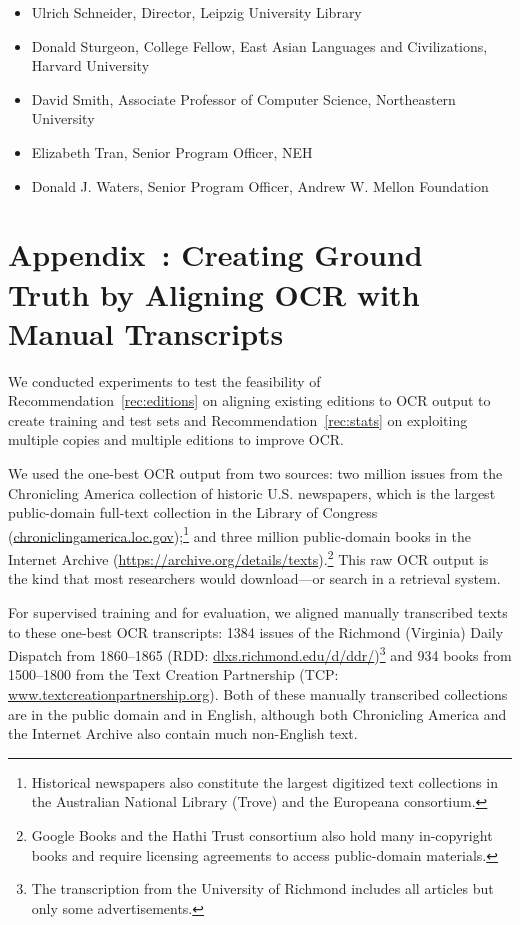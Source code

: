 \documentclass[twoside,11pt]{report}
\newcounter{appcounter}
\renewcommand{\theappcounter}{\Alph{appcounter}}
\renewcommand{\appendix}[2]{\refstepcounter{appcounter}%
  \label{app:#1}%
  \section{Appendix~\theappcounter: #2}%
  \label{sec:app-#1}}
\begin{document}
\begin{itemize}
\item Ulrich Schneider, Director, Leipzig University Library

\item Donald Sturgeon, College Fellow, East Asian Languages and Civilizations, Harvard University

\item David Smith, Associate Professor of Computer Science, Northeastern University

\item Elizabeth Tran, Senior Program Officer, NEH

\item Donald J. Waters, Senior Program Officer, Andrew W. Mellon Foundation

\end{itemize}

\appendix{eval}{Creating Ground Truth by Aligning OCR with Manual Transcripts}

We conducted experiments to test the feasibility of Recommendation~\ref{rec:editions} on aligning existing editions to OCR output to create training and test sets and Recommendation~\ref{rec:stats} on exploiting multiple copies and multiple editions to improve OCR.

We used the one-best OCR output from two sources: two million issues from the Chronicling America collection of historic U.S. newspapers, which is the largest public-domain full-text collection in the Library of Congress (\url{chroniclingamerica.loc.gov});\footnote{Historical newspapers also constitute the largest digitized text collections in the Australian National Library (Trove) and the Europeana consortium.} and three million public-domain books in the Internet Archive (\url{https://archive.org/details/texts}).\footnote{Google Books and the Hathi Trust consortium also hold many in-copyright books and require licensing agreements to access public-domain materials.} This raw OCR output is the kind that most researchers would download---or search in a retrieval system.

For supervised training and for evaluation, we aligned manually transcribed texts to these one-best OCR transcripts: 1384 issues of the Richmond (Virginia) Daily Dispatch from 1860--1865 (RDD: \url{dlxs.richmond.edu/d/ddr/})\footnote{The transcription from the University of Richmond includes all articles but only some advertisements.} and 934 books from 1500--1800 from the Text Creation Partnership (TCP: \url{www.textcreationpartnership.org}). Both of these manually transcribed collections are in the public domain and in English, although both Chronicling America and the Internet Archive also contain much non-English text.
\end{document}
